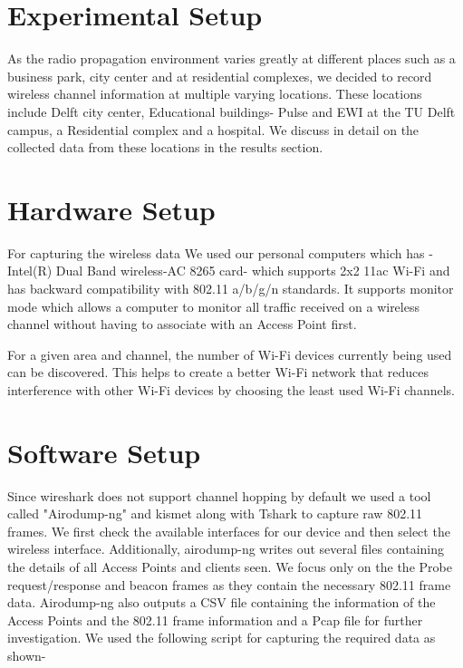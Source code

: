 \documentclass[conference]{IEEEtran}
\begin{document}
\section{Experimental Setup}
As the radio propagation environment varies greatly at different places such as a business park, city center and at residential complexes, we decided to record wireless channel information at multiple varying locations. These locations include Delft city center, Educational buildings- Pulse and EWI at the TU Delft campus, a Residential complex and a hospital. We discuss in detail on the collected data from these locations in the results section.    

\section{Hardware Setup}

For capturing the wireless data We used our personal computers which has - Intel(R) Dual Band wireless-AC 8265 card- which supports 2x2 11ac Wi-Fi and has backward compatibility with 802.11 a/b/g/n standards. It supports monitor mode which allows a computer to monitor all traffic received on a wireless channel without having to associate with an Access Point first.

For a given area and channel, the number of Wi-Fi devices currently being used can be discovered. This helps to create a better Wi-Fi network that reduces interference with other Wi-Fi devices by choosing the least used Wi-Fi channels.

 \section{Software Setup}
 
Since wireshark does not support channel hopping by default we used a tool called "Airodump-ng" \cite{c1} and kismet\cite{c2} along with Tshark to capture raw 802.11 frames.
We first check the available interfaces for our device and then select the wireless interface. Additionally, airodump-ng writes out several files containing the details of all Access Points and clients seen. We focus only on the the Probe request/response and beacon frames as they contain the necessary 802.11 frame data. Airodump-ng also outputs a CSV file containing the information of the Access Points and the 802.11 frame information and a Pcap file for further investigation. We used the following script for capturing the required data as shown-
\end{document}
